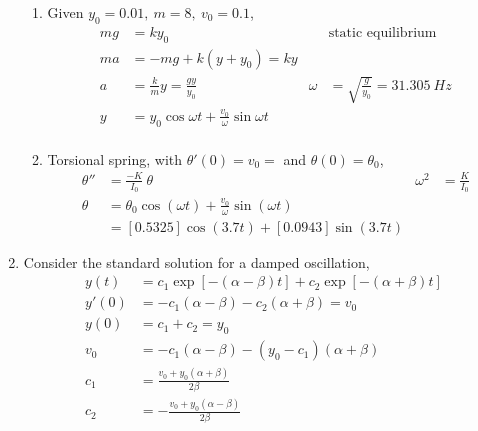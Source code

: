 \begin{enumerate}
\begin{enumerate}
              \item Given $ y_{0} = 0.01,\ m = 8,\ v_{0} = 0.1 $,
                    \begin{align}
                        mg & = ky_{0}                                                  &        & \text{static equilibrium}                  \\
                        ma & = -mg + k(y + y_{0}) = ky                                                                                       \\
                        a  & = \frac{k}{m}y = \frac{gy}{y_{0}}                         & \omega & = \sqrt{\frac{g}{y_{0}}} = \SI{31.305}{Hz} \\
                        y  & = y_{0}\cos \omega t + \frac{v_{0}}{\omega} \sin \omega t                                                       \\
                    \end{align}

              \item Torsional spring, with $ \theta' (0) = v_{0} = $ and $ \theta(0) = \theta_{0} $,
                    \begin{align}
                        \theta '' & = \frac{-K}{I_{0}}\ \theta                                        & \omega^{2} & = \frac{K}{I_{0}} \\
                        \theta    & = \theta_{0} \cos(\omega t) + \frac{v_{0}}{\omega} \sin(\omega t)                                  \\
                                  & = [0.5325] \cos(3.7 t) + [0.0943] \sin(3.7 t)
                    \end{align}
          \end{enumerate}

    \item Consider the standard solution for a damped oscillation,
          \begin{align}
              y(t)  & = c_{1}\exp\left[ -(\alpha - \beta)t \right] + c_{2}\exp\left[ -(\alpha + \beta)t \right] \\
              y'(0) & = -c_{1}(\alpha - \beta) - c_{2}(\alpha + \beta) = v_{0}                                  \\
              y(0)  & = c_{1} + c_{2} = y_{0}                                                                   \\
              v_{0} & = -c_{1}(\alpha - \beta) - (y_{0} - c_{1})(\alpha + \beta)                                \\
              c_{1} & =\frac{v_{0} + y_{0}(\alpha + \beta)}{2\beta}                                             \\
              c_{2} & = -\frac{v_{0} + y_{0}(\alpha - \beta)}{2\beta}
          \end{align}


\end{enumerate}
